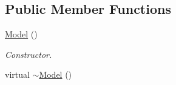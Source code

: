 \subsection*{Public Member Functions}
\begin{DoxyCompactItemize}
\item 
\hyperlink{class_model_ae3b375de5f6df4faf74a95d64748e048}{Model} ()\hypertarget{class_model_ae3b375de5f6df4faf74a95d64748e048}{}\label{class_model_ae3b375de5f6df4faf74a95d64748e048}

\begin{DoxyCompactList}\small\item\em Constructor. \end{DoxyCompactList}\item 
virtual \hyperlink{class_model_ad6ebd2062a0b823db841a0b88baac4c0}{$\sim$\+Model} ()\hypertarget{class_model_ad6ebd2062a0b823db841a0b88baac4c0}{}\label{class_model_ad6ebd2062a0b823db841a0b88baac4c0}


\end{DoxyCompactItemize}
